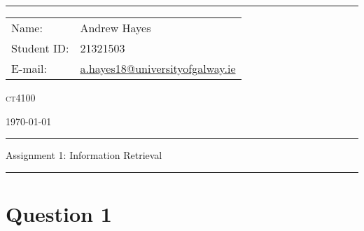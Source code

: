 \documentclass[a4paper]{article}
\begin{document}
\hrule \medskip
\begin{minipage}{0.295\textwidth} 
    \raggedright
    \footnotesize 
    \begin{tabular}{@{}l l}
        Name: & Andrew Hayes \\
        Student ID: & 21321503 \\
        E-mail: & \href{mailto://a.hayes18@universityofgalway.ie}{a.hayes18@universityofgalway.ie} \\
    \end{tabular}
\end{minipage}
\begin{minipage}{0.4\textwidth} 
    \centering 
    \vspace{0.4em}
    \LARGE 
    \textsc{ct4100} \\ 
\end{minipage}
\begin{minipage}{0.295\textwidth} 
    \raggedleft
    \today
\end{minipage}
\medskip\hrule 
\begin{center}
    \normalsize
    Assignment 1: Information Retrieval
\end{center}
\hrule

\section{Question 1}
\end{document}
